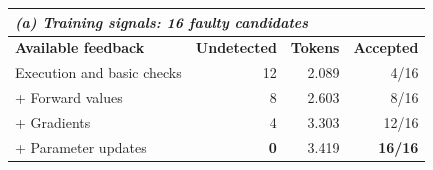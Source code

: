 \begin{tabular*}{\linewidth}{@{\extracolsep{\fill}}lrrr@{}}
\toprule
\multicolumn{4}{l}{\textit{(a) Training signals: 16 faulty candidates}} \\
\midrule
\textbf{Available feedback} & \textbf{Undetected} & \textbf{Tokens} & \textbf{Accepted} \\
\midrule
Execution and basic checks & 12 & 2.089 & 4/16 \\
\quad + Forward values & 8 & 2.603 & 8/16 \\
\quad + Gradients & 4 & 3.303 & 12/16 \\
\quad + Parameter updates & \textbf{0} & 3.419 & \textbf{16/16} \\
\bottomrule
\end{tabular*}
